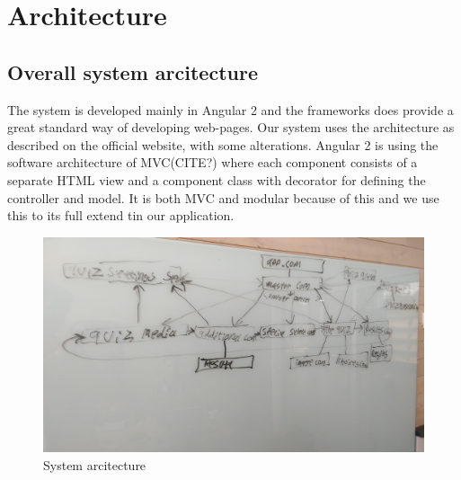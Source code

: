 \chapter{Architecture}
\label{chap:architecture}


\section{Overall system arcitecture}
\label{sec:overallArc}
The system is developed mainly in Angular 2\cite{Angular2:online} and the frameworks does provide a great standard way of developing web-pages. Our system uses the architecture as described on the official website, with some alterations. Angular 2 is using the software architecture of MVC(CITE?) where each component consists of a separate HTML view and a component class with decorator for defining the controller and model. It is both MVC and modular because of this and we use this to its full extend tin our application. 

\begin{figure}[h]
  \centering
  \includegraphics[width=1.0\textwidth]{figures/overview.jpg}
  \caption[Hierarchy]{System arcitecture}
  \label{fig:Hierarchy}
\end{figure}

